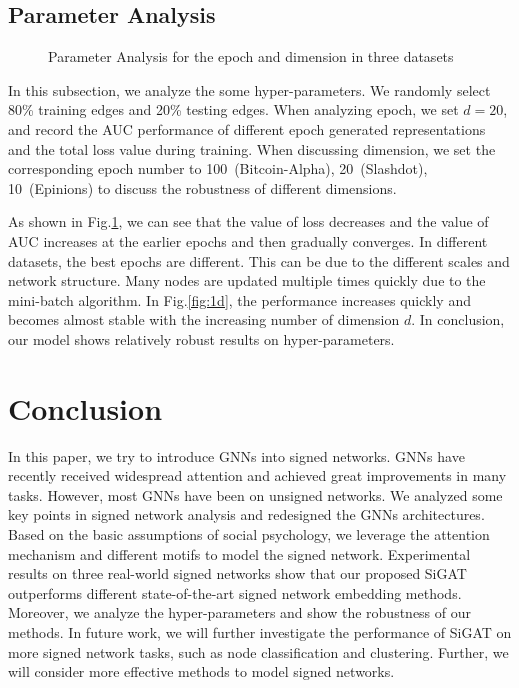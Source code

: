 \documentclass[runningheads]{llncs}
\begin{document}
\subsection{Parameter Analysis}
\vspace{-20px}
\begin{figure}[H]
\setlength{\leftskip}{-40pt}
   \noindent {}
    \caption{Parameter Analysis for the epoch and dimension in three datasets}
    \label{fig:auc_loss}
 \vspace{-10px}
\end{figure}
In this subsection, we analyze the some hyper-parameters. 
We randomly select 80\% training edges and 20\% testing edges.
When analyzing epoch, we set $d=20$, and record the AUC performance of different epoch generated representations and the total loss value during training.
When discussing dimension, we set the corresponding epoch number to 100~(Bitcoin-Alpha), 20~(Slashdot), 10~(Epinions) to discuss the robustness of different dimensions. 

As shown in Fig.\ref{fig:auc_loss}, we can see that the value of loss decreases and the value of AUC increases at the earlier epochs and then gradually converges. In different datasets, the best epochs are different. This can be due to the different scales and network structure. Many nodes are updated multiple times quickly due to the mini-batch algorithm. 
In Fig.\ref{fig:1d}, the performance increases quickly and becomes almost stable with the increasing number of dimension $d$. In conclusion, our model shows relatively robust results on hyper-parameters. 
\section{Conclusion}\label{sec:conclusion}
In this paper, we try to introduce GNNs into signed networks. 
GNNs have recently received widespread attention and achieved great improvements in many tasks.
However, most GNNs have been on unsigned networks.
We analyzed some key points in signed network analysis and redesigned the GNNs architectures. 
Based on the basic assumptions of social psychology, we leverage the attention mechanism and different motifs to model the signed network. 
Experimental results on three real-world signed networks show that our proposed SiGAT outperforms different state-of-the-art signed network embedding methods. 
Moreover, we analyze the hyper-parameters and show the robustness of our methods.
In future work, we will further investigate the performance of SiGAT on more signed network tasks, such as node classification and clustering. Further, we will consider more effective methods to model signed networks. 
\end{document}
